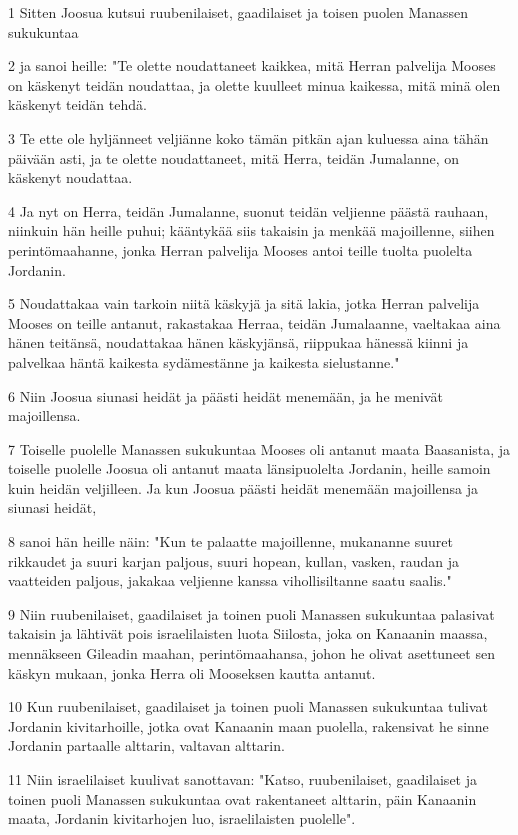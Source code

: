 \par 1 Sitten Joosua kutsui ruubenilaiset, gaadilaiset ja toisen puolen Manassen sukukuntaa
\par 2 ja sanoi heille: "Te olette noudattaneet kaikkea, mitä Herran palvelija Mooses on käskenyt teidän noudattaa, ja olette kuulleet minua kaikessa, mitä minä olen käskenyt teidän tehdä.
\par 3 Te ette ole hyljänneet veljiänne koko tämän pitkän ajan kuluessa aina tähän päivään asti, ja te olette noudattaneet, mitä Herra, teidän Jumalanne, on käskenyt noudattaa.
\par 4 Ja nyt on Herra, teidän Jumalanne, suonut teidän veljienne päästä rauhaan, niinkuin hän heille puhui; kääntykää siis takaisin ja menkää majoillenne, siihen perintömaahanne, jonka Herran palvelija Mooses antoi teille tuolta puolelta Jordanin.
\par 5 Noudattakaa vain tarkoin niitä käskyjä ja sitä lakia, jotka Herran palvelija Mooses on teille antanut, rakastakaa Herraa, teidän Jumalaanne, vaeltakaa aina hänen teitänsä, noudattakaa hänen käskyjänsä, riippukaa hänessä kiinni ja palvelkaa häntä kaikesta sydämestänne ja kaikesta sielustanne."
\par 6 Niin Joosua siunasi heidät ja päästi heidät menemään, ja he menivät majoillensa.
\par 7 Toiselle puolelle Manassen sukukuntaa Mooses oli antanut maata Baasanista, ja toiselle puolelle Joosua oli antanut maata länsipuolelta Jordanin, heille samoin kuin heidän veljilleen. Ja kun Joosua päästi heidät menemään majoillensa ja siunasi heidät,
\par 8 sanoi hän heille näin: "Kun te palaatte majoillenne, mukananne suuret rikkaudet ja suuri karjan paljous, suuri hopean, kullan, vasken, raudan ja vaatteiden paljous, jakakaa veljienne kanssa vihollisiltanne saatu saalis."
\par 9 Niin ruubenilaiset, gaadilaiset ja toinen puoli Manassen sukukuntaa palasivat takaisin ja lähtivät pois israelilaisten luota Siilosta, joka on Kanaanin maassa, mennäkseen Gileadin maahan, perintömaahansa, johon he olivat asettuneet sen käskyn mukaan, jonka Herra oli Mooseksen kautta antanut.
\par 10 Kun ruubenilaiset, gaadilaiset ja toinen puoli Manassen sukukuntaa tulivat Jordanin kivitarhoille, jotka ovat Kanaanin maan puolella, rakensivat he sinne Jordanin partaalle alttarin, valtavan alttarin.
\par 11 Niin israelilaiset kuulivat sanottavan: "Katso, ruubenilaiset, gaadilaiset ja toinen puoli Manassen sukukuntaa ovat rakentaneet alttarin, päin Kanaanin maata, Jordanin kivitarhojen luo, israelilaisten puolelle".
